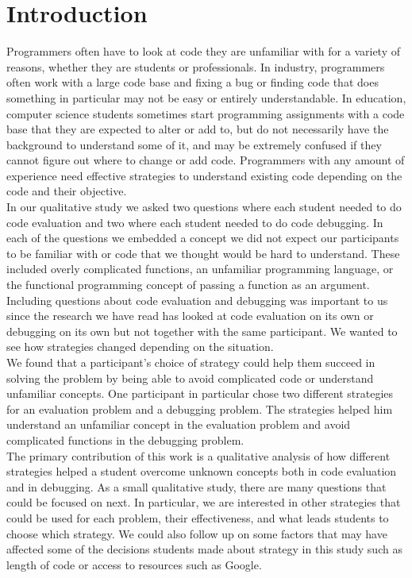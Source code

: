 \section{Introduction}

Programmers often have to look at code they are unfamiliar with for a variety of reasons, whether they are students or professionals.
In industry, programmers often work with a large code base and fixing a bug or finding code that does something in particular may not be easy or entirely understandable.
In education, computer science students sometimes start programming assignments with a code base that they are expected to alter or add to, but do not necessarily have the background to understand some of it, and may be extremely confused if they cannot figure out where to change or add code.
Programmers with any amount of experience need effective strategies to understand existing code depending on the code and their objective. \\

In our qualitative study we asked two questions where each student needed to do code evaluation and two where each student needed to do code debugging.
In each of the questions we embedded a concept we did not expect our participants to be familiar with or code that we thought would be hard to understand.
These included overly complicated functions, an unfamiliar programming language, or the functional programming concept of passing a function as an argument.
Including questions about code evaluation and debugging was important to us since the research we have read has looked at code evaluation on its own or debugging on its own but not together with the same participant.
We wanted to see how strategies changed depending on the situation. \\

We found that a participant's choice of strategy could help them succeed in solving the problem by being able to avoid complicated code or understand unfamiliar concepts.
One participant in particular chose two different strategies for an evaluation problem and a debugging problem.
The strategies helped him understand an unfamiliar concept in the evaluation problem and avoid complicated functions in the debugging problem. \\

The primary contribution of this work is a qualitative analysis of how different strategies helped a student overcome unknown concepts both in code evaluation and in debugging.
As a small qualitative study, there are many questions that could be focused on next.
In particular, we are interested in other strategies that could be used for each problem, their effectiveness, and what leads students to choose which strategy.
We could also follow up on some factors that may have affected some of the decisions students made about strategy in this study such as length of code or access to resources such as Google.\\


